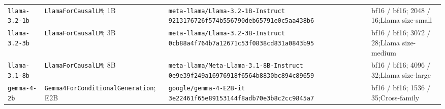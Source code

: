 \documentclass[pdflatex,sn-basic]{sn-jnl}
\begin{document}
\begin{longtable}{@{}>{\raggedright\arraybackslash}p{1.45cm}
>{\raggedright\arraybackslash}p{2.25cm}
>{\raggedright\arraybackslash}p{4.35cm}
>{\raggedright\arraybackslash}p{2.35cm}@{}}
\texttt{llama-}\newline\texttt{3.2-1b} & \texttt{LlamaFor}\newline\texttt{CausalLM}; 1B & \texttt{meta-llama/}\newline\texttt{Llama-3.2-1B-Instruct}\newline
\texttt{9213176726}\newline\texttt{f574b55679}\newline\texttt{0deb65791e}\newline\texttt{0c5aa438b6} & bf16 / bf16; 2048 / 16;\newline Llama size-small \\
\texttt{llama-}\newline\texttt{3.2-3b} & \texttt{LlamaFor}\newline\texttt{CausalLM}; 3B & \texttt{meta-llama/}\newline\texttt{Llama-3.2-3B-Instruct}\newline
\texttt{0cb88a4f76}\newline\texttt{4b7a12671c}\newline\texttt{53f0838cd8}\newline\texttt{31a0843b95} & bf16 / bf16; 3072 / 28;\newline Llama size-medium \\
\texttt{llama-}\newline\texttt{3.1-8b} & \texttt{LlamaFor}\newline\texttt{CausalLM}; 8B & \texttt{meta-llama/}\newline\texttt{Meta-Llama-3.1-8B-Instruct}\newline
\texttt{0e9e39f249}\newline\texttt{a16976918f}\newline\texttt{6564b8830b}\newline\texttt{c894c89659} & bf16 / bf16; 4096 / 32;\newline Llama size-large \\
\texttt{gemma-}\newline\texttt{4-2b} & \texttt{Gemma4For}\newline\texttt{Conditional}\newline\texttt{Generation}; E2B & \texttt{google/gemma-4-E2B-it}\newline
\texttt{3e22461f65}\newline\texttt{e89153144f}\newline\texttt{8adb70e3b8}\newline\texttt{c2cc9845a7} & bf16 / bf16; 1536 / 35;\newline Cross-family \\

\end{longtable}
\end{document}

